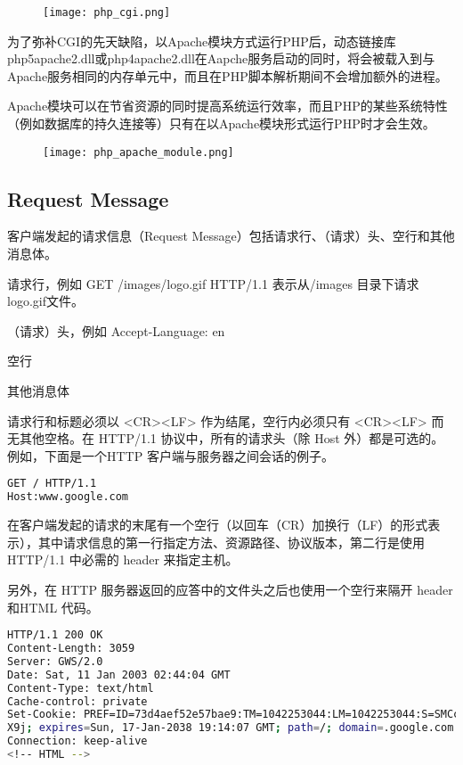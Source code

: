 \begin{figure}[htbp]
\centering
\texttt{[image: php\_cgi.png]}
\end{figure}

为了弥补CGI的先天缺陷，以Apache模块方式运行PHP后，动态链接库php5apache2.dll或php4apache2.dll在Aapche服务启动的同时，将会被载入到与Apache服务相同的内存单元中，而且在PHP脚本解析期间不会增加额外的进程。

Apache模块可以在节省资源的同时提高系统运行效率，而且PHP的某些系统特性（例如数据库的持久连接等）只有在以Apache模块形式运行PHP时才会生效。



\begin{figure}[htbp]
\centering
\texttt{[image: php\_apache\_module.png]}
\end{figure}

\subsection{Request Message}

客户端发起的请求信息（Request Message）包括请求行、（请求）头、空行和其他消息体。

\begin{compactitem}
\item 请求行，例如 GET /images/logo.gif HTTP/1.1 表示从/images 目录下请求 logo.gif文件。
\item （请求）头，例如 Accept-Language: en
\item 空行
\item 其他消息体
\end{compactitem}

请求行和标题必须以 <CR><LF> 作为结尾，空行内必须只有 <CR><LF> 而无其他空格。在 HTTP/1.1 协议中，所有的请求头（除 Host 外）都是可选的。例如，下面是一个HTTP 客户端与服务器之间会话的例子。



\begin{lstlisting}[language=bash]
GET / HTTP/1.1
Host:www.google.com
\end{lstlisting}

在客户端发起的请求的末尾有一个空行（以回车（CR）加换行（LF）的形式表示），其中请求信息的第一行指定方法、资源路径、协议版本，第二行是使用 HTTP/1.1 中必需的 header 来指定主机。

另外，在 HTTP 服务器返回的应答中的文件头之后也使用一个空行来隔开 header 和HTML 代码。




\begin{lstlisting}[language=bash]
HTTP/1.1 200 OK
Content-Length: 3059
Server: GWS/2.0
Date: Sat, 11 Jan 2003 02:44:04 GMT
Content-Type: text/html
Cache-control: private
Set-Cookie: PREF=ID=73d4aef52e57bae9:TM=1042253044:LM=1042253044:S=SMCc_HRPCQiqy
X9j; expires=Sun, 17-Jan-2038 19:14:07 GMT; path=/; domain=.google.com
Connection: keep-alive
<!-- HTML -->
\end{lstlisting}

